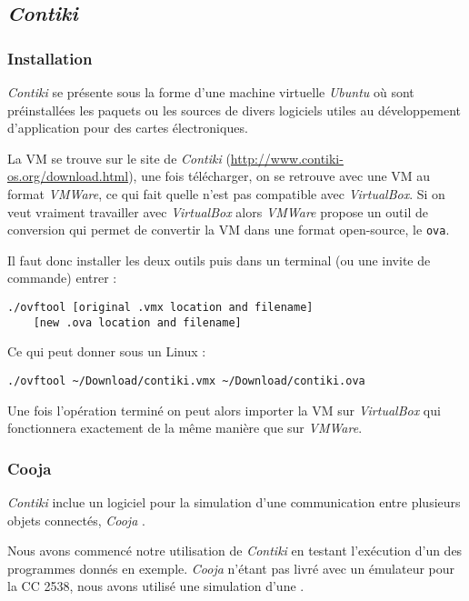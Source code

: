 \subsection{\emph{Contiki}}

\subsubsection{Installation}

\emph{Contiki} se présente sous la forme d’une machine virtuelle \emph{Ubuntu} où sont préinstallées les paquets ou les sources de divers logiciels utiles au développement d’application pour des cartes électroniques.

La VM se trouve sur le site de \emph{Contiki} (\url{http://www.contiki-os.org/download.html}), une fois télécharger, on se retrouve avec une VM au format \emph{VMWare}, ce qui fait quelle n'est pas compatible avec \emph{VirtualBox}.
Si on veut vraiment travailler avec \emph{VirtualBox} alors \emph{VMWare} propose un outil de conversion qui permet de convertir la VM dans une format open-source, le \texttt{ova}.

Il faut donc installer les deux outils puis dans un terminal (ou une invite de commande) entrer :
\begin{verbatim}
./ovftool [original .vmx location and filename]
	[new .ova location and filename]
\end{verbatim}
Ce qui peut donner sous un Linux :
\begin{verbatim}
./ovftool ~/Download/contiki.vmx ~/Download/contiki.ova
\end{verbatim}

Une fois l'opération terminé on peut alors importer la VM sur \emph{VirtualBox} qui fonctionnera exactement de la même manière que sur \emph{VMWare}.
 
\subsubsection{Cooja}

\emph{Contiki} inclue un logiciel pour la simulation d’une communication entre plusieurs objets connectés, \emph{Cooja} .

Nous avons commencé notre utilisation de \emph{Contiki} en testant l’exécution d’un des programmes donnés en exemple.
\emph{Cooja} n’étant pas livré avec un émulateur pour la CC 2538, nous avons utilisé une simulation d’une \todo[skymote ?].


